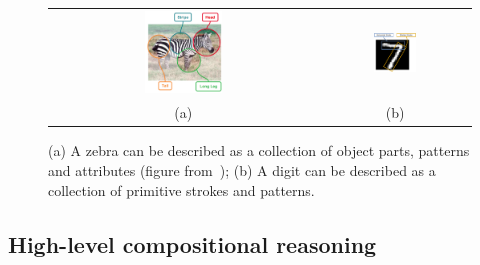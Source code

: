 \begin{figure}[htbp]
    \centering
    \setlength{\tabcolsep}{10pt}
    \begin{tabular}{cc}
         \includegraphics[width=0.3\textwidth,align=c]{figs/zebra_atrib.png}
         & \includegraphics[width=0.3\textwidth,align=c]{figs/mnist_atrib.pdf} \\
         (a) & (b)
    \end{tabular}
    \vspace{-5pt}
    \caption{ (a) A zebra can be described as a collection of object parts, patterns and attributes (figure from~\citep{demirel2017attributes2classname}); (b) A digit can be described as a collection of primitive strokes and patterns.}
    \label{fig:attrib}
    \vspace{-10pt}
\end{figure}

\subsection{High-level compositional reasoning\label{sec:bg_high}}
\vspace{-3pt}

